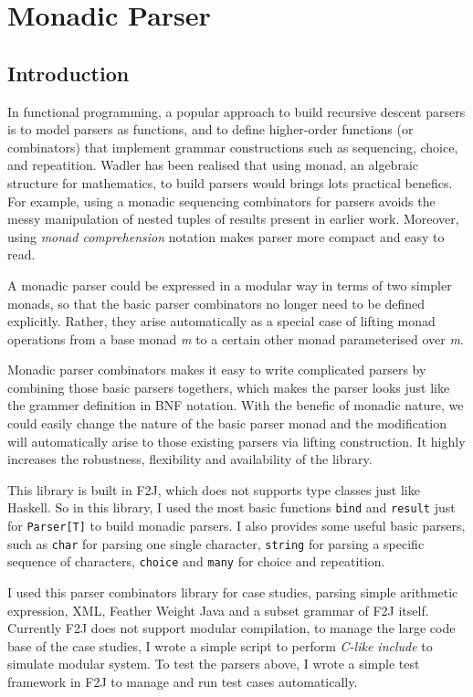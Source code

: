 \chapter{Monadic Parser}

\section{Introduction}

In functional programming, a popular approach to build recursive descent parsers is to model parsers as functions, and to define higher-order functions (or combinators) that implement grammar constructions such as sequencing, choice, and repeatition. Wadler \cite{Wadler:1992} has been realised that using monad, an algebraic structure for mathematics, to build parsers would brings lots practical benefics. For example, using a monadic sequencing combinators for parsers avoids the messy manipulation of nested tuples of results present in earlier work. Moreover, using \textit{monad comprehension} notation makes parser more compact and easy to read.

A monadic parser could be expressed in a modular way in terms of two simpler monads, so that the basic parser combinators no longer need to be defined explicitly. Rather, they arise automatically as a special case of lifting monad operations from a base monad \textit{m} to a certain other monad parameterised over \textit{m}. \cite{Hutton:1996}

Monadic parser combinators makes it easy to write complicated parsers by combining those basic parsers togethers, which makes the parser looks just like the grammer definition in BNF notation. With the benefic of monadic nature, we could easily change the nature of the basic parser monad and the modification will automatically arise to those existing parsers via lifting construction. It highly increases the robustness, flexibility and availability of the library.

This library is built in F2J, which does not supports type classes just like Haskell. So in this library, I used the most basic functions \texttt{bind} and \texttt{result} just for \texttt{Parser[T]} to build monadic parsers. I also provides some useful basic parsers, such as \texttt{char} for parsing one single character, \texttt{string} for parsing a specific sequence of characters, \texttt{choice} and \texttt{many} for choice and repeatition.

I used this parser combinators library for case studies, parsing simple arithmetic expression, XML, Feather Weight Java and a subset grammar of F2J itself. Currently F2J does not support modular compilation, to manage the large code base of the case studies, I wrote a simple script to perform \textit{C-like include} to simulate modular system. To test the parsers above, I wrote a simple test framework in F2J to manage and run test cases automatically.

